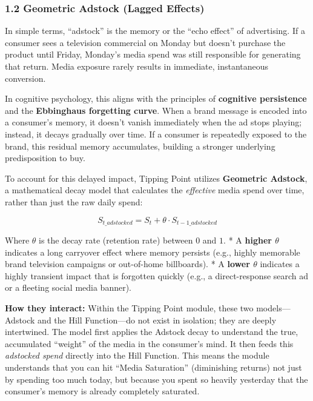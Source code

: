 \documentclass[
]{article}
\begin{document}
\subsubsection{1.2 Geometric Adstock (Lagged
Effects)}\label{geometric-adstock-lagged-effects}

In simple terms, ``adstock'' is the memory or the ``echo effect'' of
advertising. If a consumer sees a television commercial on Monday but
doesn't purchase the product until Friday, Monday's media spend was
still responsible for generating that return. Media exposure rarely
results in immediate, instantaneous conversion.

In cognitive psychology, this aligns with the principles of
\textbf{cognitive persistence} and the \textbf{Ebbinghaus forgetting
curve}. When a brand message is encoded into a consumer's memory, it
doesn't vanish immediately when the ad stops playing; instead, it decays
gradually over time. If a consumer is repeatedly exposed to the brand,
this residual memory accumulates, building a stronger underlying
predisposition to buy.

To account for this delayed impact, Tipping Point utilizes
\textbf{Geometric Adstock}, a mathematical decay model that calculates
the \emph{effective} media spend over time, rather than just the raw
daily spend:

\[ S_{t\_adstocked} = S_t + \theta \cdot S_{t-1\_adstocked} \]

Where \(\theta\) is the decay rate (retention rate) between \(0\) and
\(1\). * A \textbf{higher \(\theta\)} indicates a long carryover effect
where memory persists (e.g., highly memorable brand television campaigns
or out-of-home billboards). * A \textbf{lower \(\theta\)} indicates a
highly transient impact that is forgotten quickly (e.g., a
direct-response search ad or a fleeting social media banner).

\textbf{How they interact:} Within the Tipping Point module, these two
models---Adstock and the Hill Function---do not exist in isolation; they
are deeply intertwined. The model first applies the Adstock decay to
understand the true, accumulated ``weight'' of the media in the
consumer's mind. It then feeds this \emph{adstocked spend} directly into
the Hill Function. This means the module understands that you can hit
``Media Saturation'' (diminishing returns) not just by spending too much
today, but because you spent so heavily yesterday that the consumer's
memory is already completely saturated.
\end{document}
